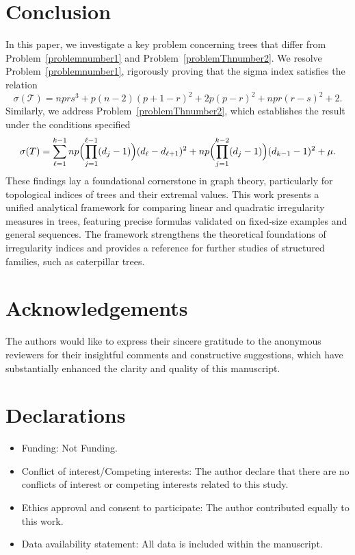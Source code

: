 \documentclass[12pt, a4paper]{article}
\theoremstyle{plain}  %
\theoremstyle{definition}  %
\newcommand{\TT}{\mathcal{T}}
\begin{document}
\section{Conclusion}\label{sec5}
In this paper, we investigate a key problem concerning trees that differ from Problem~\ref{problemnumber1} and Problem~\ref{problemThnumber2}. We resolve Problem~\ref{problemnumber1}, rigorously proving that the sigma index satisfies the relation
\[
\sigma(\TT)=nprs^3+p(n-2)(p+1-r)^2+2p(p-r)^2+npr(r-s)^2+2.
\]
Similarly, we address Problem~\ref{problemThnumber2}, which establishes the result under the conditions specified 
\[
\sigma(T)=\sum_{\ell=1}^{k-1} np\Bigl(\prod_{j=1}^{\ell-1}(d_j-1)\Bigr)(d_\ell-d_{\ell+1})^2+np\Bigl(\prod_{j=1}^{k-2}(d_j-1)\Bigr)(d_{k-1}-1)^2+\mu.
\]
These findings lay a foundational cornerstone in graph theory, particularly for topological indices of trees and their extremal values. This work presents a unified analytical framework for comparing linear and quadratic irregularity measures in trees, featuring precise formulas validated on fixed-size examples and general sequences. The framework strengthens the theoretical foundations of irregularity indices and provides a reference for further studies of structured families, such as caterpillar trees.

\section*{Acknowledgements}
The authors would like to express their sincere gratitude to the anonymous reviewers for their insightful comments and constructive suggestions, which have substantially enhanced the clarity and quality of this manuscript.


\section*{Declarations}
\begin{itemize}
	\item Funding: Not Funding.
	\item Conflict of interest/Competing interests: The author declare that there are no conflicts of interest or competing interests related to this study.
	\item Ethics approval and consent to participate: The author contributed equally to this work.
	\item Data availability statement: All data is included within the manuscript.
\end{itemize}
\end{document}

